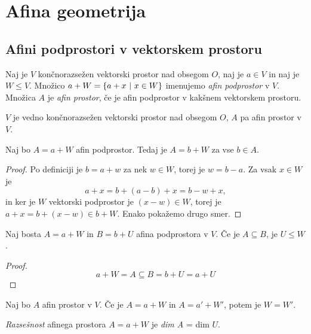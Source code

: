 \section{Afina geometrija}

\subsection{Afini podprostori v vektorskem prostoru}


\begin{definicija}
    Naj je $V$ končnorazsežen vektorski prostor nad obsegom $O$, naj je $a \in V$ in naj je $W \leq V$. Množico $a + W = \left\{a + x~\middle\vert~x \in W\right\}$ imenujemo \emph{afin podprostor} v $V$.
    Množica $A$ je \emph{afin prostor}, če je afin podprostor v kakšnem vektorskem prostoru.
\end{definicija}

\begin{opomba}
    $V$ je vedno končnorazsežen vektorski prostor nad obsegom $O$, $A$ pa afin prostor v $V$.
\end{opomba}

\begin{lema}
    Naj bo $A = a + W$ afin podprostor. Tedaj je $A = b + W$ za vse $b \in A$.
\end{lema}

\begin{proof}
    Po definiciji je $b = a + w$ za nek $w \in W$, torej je $w = b - a$. Za vsak $x \in W$ je
    $$ a + x = b + (a - b) + x = b - w + x, $$
    in ker je $W$ vektorski podprostor je $(x - w) \in W$, torej je $a + x = b + (x - w) \in b + W$. Enako pokažemo drugo smer.
\end{proof}

\begin{posledica}
    Naj bosta $A = a + W$ in $B = b + U$ afina podprostora v $V$. Če je $A \subseteq B$, je $U \leq W$.
\end{posledica}

\begin{proof}
    $$ a + W = A \subseteq B = b + U = a + U$$
\end{proof}

\begin{posledica}
    Naj bo $A$ afin prostor v $V$. Če je $A = a + W$ in $A = a' + W'$, potem je $W = W'$.
\end{posledica}

\begin{definicija}
    \emph{Razsešnost} afinega prostora $A = a + W$ je \emph{dim A} = dim $U$.
\end{definicija}

